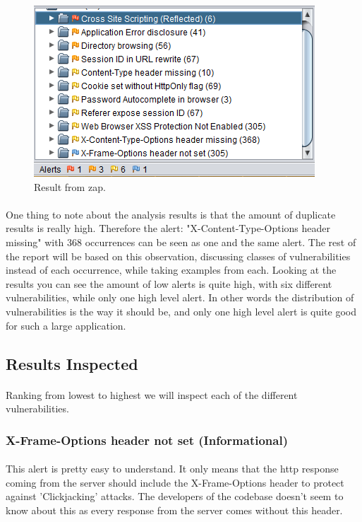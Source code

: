 \documentclass[11pt,english,a4paper]{report}
\begin{document}
\begin{figure}[h]
    \centering
    \includegraphics[scale=0.65]{images/zap-result.png}
    \caption{Result from \gls{zap}.}
    \label{fig:zapresults}
\end{figure}

\paragraph{}
One thing to note about the analysis results is that the amount of duplicate results is really high. 
Therefore the alert: "X-Content-Type-Options header missing" with 368 occurrences can be seen as one and the same alert. 
The rest of the report will be based on this observation, discussing classes of vulnerabilities instead of each occurrence, while taking examples from each.
Looking at the results you can see the amount of low alerts is quite high, with six different vulnerabilities, while only one high level alert. 
In other words the distribution of vulnerabilities is the way it should be, and only one high level alert is quite good for such a large application.

\subsection{Results Inspected}
\paragraph{}
Ranking from lowest to highest we will inspect each of the different vulnerabilities.

\subsubsection{X-Frame-Options header not set (Informational)}
\paragraph{}
This alert is pretty easy to understand. 
It only means that the \gls{http} response coming from the server should include the X-Frame-Options header to protect against 'Clickjacking' attacks.
The developers of the codebase doesn't seem to know about this as every response from the server comes without this header.
\end{document}
